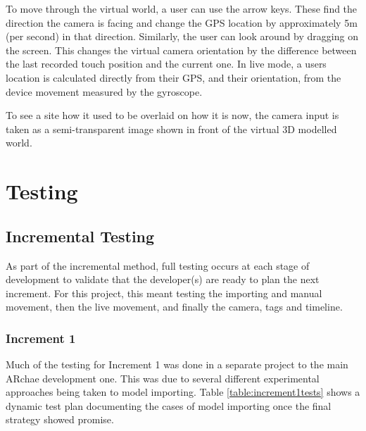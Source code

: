 \documentclass[12pt, a4paper]{article}
\begin{document}
To move through the virtual world, a user can use the arrow keys. These find the direction the camera is facing and change the GPS location by approximately 5m (per second) in that direction. Similarly, the user can look around by dragging on the screen. This  changes the virtual camera orientation by the difference between the last recorded touch position and the current one. In live mode, a users location is calculated directly from their GPS, and their orientation, from the device movement measured by the gyroscope.

To see a site how it used to be overlaid on how it is now, the camera input is taken as a semi-transparent image shown in front of the virtual 3D modelled world. 

\newpage
\section{Testing}

\subsection{Incremental Testing}
As part of the incremental method, full testing occurs at each stage of development to validate that the developer(s) are ready to plan the next increment. For this project, this meant testing the importing and manual movement, then the live movement, and finally the camera, tags and timeline. 

\subsubsection{Increment 1}
Much of the testing for Increment 1 was done in a separate project to the main ARchae development one. This was due to several different experimental approaches being taken to model importing. Table \ref{table:increment1tests} shows a dynamic test plan documenting the cases of model importing once the final strategy showed promise. 
\end{document}
